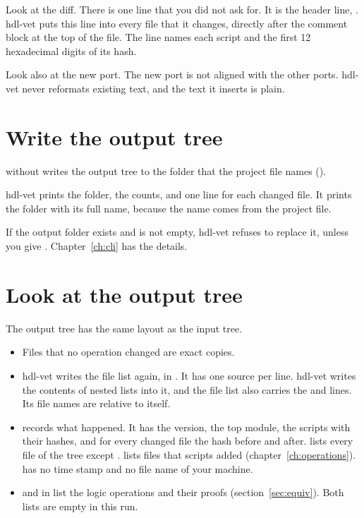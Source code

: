Look at the diff. There is one line that you did not ask for. It is the header
line, . hdl-vet puts this line into every file that it changes, directly after the comment
block at the top of the file. The line
names each script and the first 12 hexadecimal digits of its hash.

Look also at the new port. The new port is not aligned with the other ports. hdl-vet
never reformats existing text, and the text it inserts is plain.

\section{Write the output tree}

 without  writes the output tree to the folder that
the project file names ().



hdl-vet prints the folder, the counts, and one line for each changed file. It prints
the folder with its full name, because the name comes from the project file.

If the output folder exists and is not empty, hdl-vet refuses to replace it,
unless you give . Chapter~\ref{ch:cli} has the details.

\section{Look at the output tree}

The output tree has the same layout as the input tree.



\begin{itemize}
\item Files that no operation changed are exact copies.
\item hdl-vet writes the file list again, in . It has one source per
  line. hdl-vet writes the contents of nested lists into it, and the file list also
  carries the  and  lines. Its file names are relative to
  itself.
\item {} records what happened. It has the version, the top module,
  the scripts with their hashes, and for every changed file the hash before and
  after.  lists every file of the tree except .
   lists files that scripts added (chapter~\ref{ch:operations}).
   has no time stamp and no file name of your machine.
\item {} and  in  list the logic operations
  and their proofs (section~\ref{sec:equiv}). Both lists are empty in this run.
\end{itemize}

